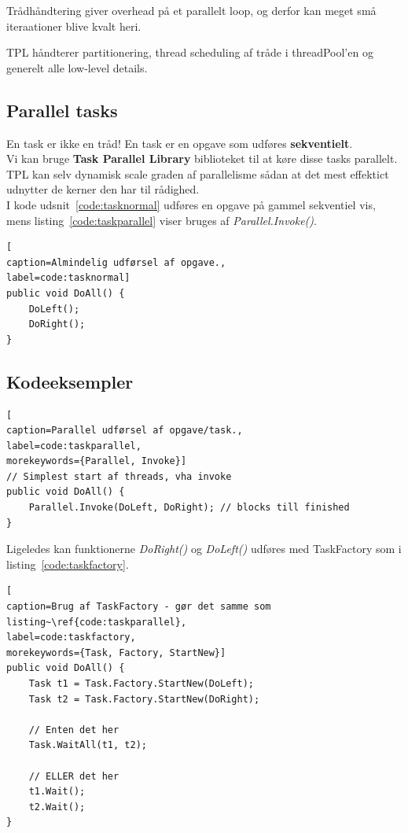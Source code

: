 Trådhåndtering giver overhead på et parallelt loop, og derfor kan meget små iteraationer blive kvalt heri.

TPL håndterer partitionering, thread scheduling af tråde i threadPool'en og generelt alle low-level details.

\subsection{Parallel tasks}

En task er ikke en tråd! En task er en opgave som udføres \textbf{sekventielt}.\\

Vi kan bruge \textbf{Task Parallel Library} biblioteket til at køre disse tasks parallelt. TPL kan selv dynamisk scale graden af parallelisme sådan at det mest effektict udnytter de kerner den har til rådighed.\\

I kode udsnit~\ref{code:tasknormal} udføres en opgave på gammel sekventiel vis, mens listing~\ref{code:taskparallel} viser bruges af \textit{Parallel.Invoke()}.

\begin{lstlisting}[
caption=Almindelig udførsel af opgave.,
label=code:tasknormal]
public void DoAll() {
	DoLeft();
	DoRight();
}
\end{lstlisting}

\subsection{Kodeeksempler}

\begin{lstlisting}[
caption=Parallel udførsel af opgave/task.,
label=code:taskparallel,
morekeywords={Parallel, Invoke}]
// Simplest start af threads, vha invoke
public void DoAll() {
	Parallel.Invoke(DoLeft, DoRight); // blocks till finished
}
\end{lstlisting}

Ligeledes kan funktionerne \textit{DoRight()} og \textit{DoLeft()} udføres med TaskFactory som i listing~\ref{code:taskfactory}.

\begin{lstlisting}[
caption=Brug af TaskFactory - gør det samme som listing~\ref{code:taskparallel},
label=code:taskfactory,
morekeywords={Task, Factory, StartNew}]
public void DoAll() {
	Task t1 = Task.Factory.StartNew(DoLeft);
	Task t2 = Task.Factory.StartNew(DoRight);
	
	// Enten det her
	Task.WaitAll(t1, t2);
	
	// ELLER det her
	t1.Wait();
	t2.Wait();
}
\end{lstlisting}

